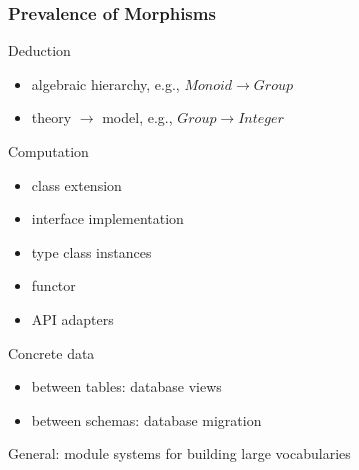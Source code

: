 \begin{frame}\frametitle{Prevalence of Morphisms}
Deduction
\begin{itemize}
\item algebraic hierarchy, e.g., $Monoid\to Group$
\item theory $\to$ model, e.g., $Group\to Integer$
\end{itemize}
Computation
\begin{itemize}
\item class extension
\item interface implementation
\item type class instances
\item functor
\item API adapters
\end{itemize}
Concrete data
\begin{itemize}
\item between tables: database views
\item between schemas: database migration
\end{itemize}

General: module systems for building large vocabularies
\end{frame}
